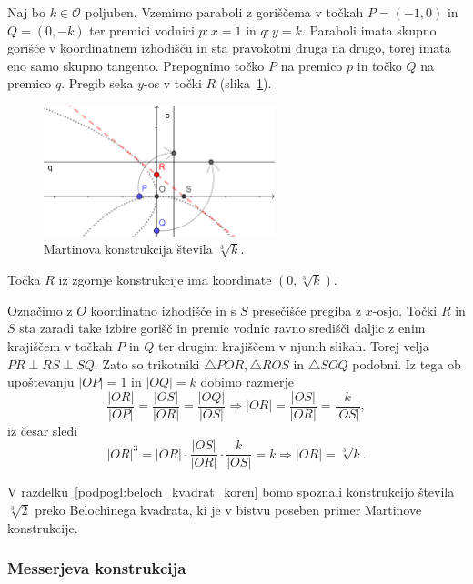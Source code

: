 Naj bo $k \in \mathcal{O}$ poljuben. Vzemimo paraboli z goriščema v točkah $P = (-1, 0)$ in $Q = (0, -k)$ ter premici vodnici $p: x = 1$ in $q: y = k$. Paraboli imata skupno gorišče v koordinatnem izhodišču in sta pravokotni druga na drugo, torej imata eno samo skupno tangento. Prepognimo točko $P$ na premico $p$ in točko $Q$ na premico $q$. Pregib seka $y$-os v točki $R$ (slika~\ref{fig:martin}).
\begin{figure}[h]
    \centering
    \includegraphics[width=0.6\textwidth]{images/starogr_problemi/cube_martin.png}
    \caption[Martinova konstrukcija kubičnega korena]{Martinova konstrukcija števila $\sqrt[3]{k}$.}
    \label{fig:martin}
\end{figure}
\begin{trditev}
    Točka $R$ iz zgornje konstrukcije ima koordinate $(0, \sqrt[3]{k})$.
\end{trditev}
\begin{dokaz}
    Označimo z $O$ koordinatno izhodišče in s $S$ presečišče pregiba z $x$-osjo. Točki $R$ in $S$ sta zaradi take izbire gorišč in premic vodnic ravno središči daljic z enim krajiščem v točkah $P$ in $Q$ ter drugim krajiščem v njunih slikah. Torej velja $PR \perp RS \perp SQ$. Zato so trikotniki $\triangle POR, \triangle ROS$ in $\triangle SOQ$ podobni. Iz tega ob upoštevanju $|OP| = 1$ in $|OQ| = k$ dobimo razmerje
    $$ \frac{|OR|}{|OP|} = \frac{|OS|}{|OR|} = \frac{|OQ|}{|OS|} \Longrightarrow |OR| = \frac{|OS|}{|OR|} = \frac{k}{|OS|}, $$
    iz česar sledi
    $$ |OR|^3 = |OR| \cdot \frac{|OS|}{|OR|} \cdot \frac{k}{|OS|} = k \Longrightarrow |OR| = \sqrt[3]{k}.$$
\end{dokaz}
\begin{opomba}
    V razdelku~\ref{podpogl:beloch_kvadrat_koren} bomo spoznali konstrukcijo števila $\sqrt[3]{2}$ preko Belochinega kvadrata, ki je v bistvu poseben primer Martinove konstrukcije.
\end{opomba}

\subsubsection*{Messerjeva konstrukcija}

